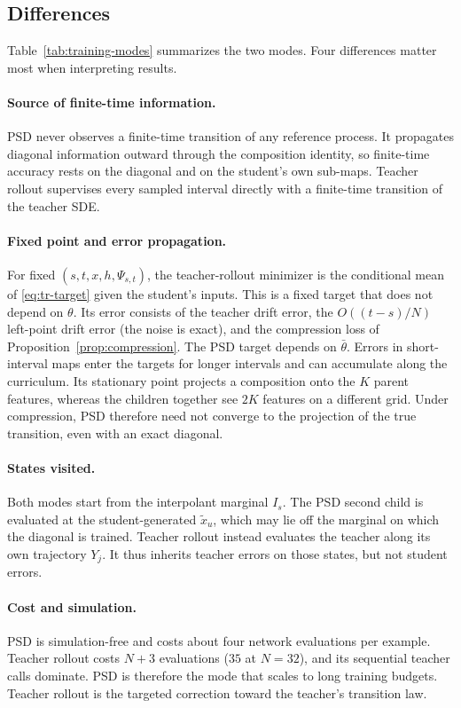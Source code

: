 \subsection{Differences}
Table~\ref{tab:training-modes} summarizes the two modes. Four differences matter most when interpreting results.

\paragraph{Source of finite-time information.} PSD never observes a finite-time transition of any reference process. It propagates diagonal information outward through the composition identity, so finite-time accuracy rests on the diagonal and on the student's own sub-maps. Teacher rollout supervises every sampled interval directly with a finite-time transition of the teacher SDE.

\paragraph{Fixed point and error propagation.} For fixed $(s,t,x,h,\Psi_{s,t})$, the teacher-rollout minimizer is the conditional mean of \eqref{eq:tr-target} given the student's inputs. This is a fixed target that does not depend on $\theta$. Its error consists of the teacher drift error, the $O((t-s)/N)$ left-point drift error (the noise is exact), and the compression loss of Proposition~\ref{prop:compression}. The PSD target depends on $\bar\theta$. Errors in short-interval maps enter the targets for longer intervals and can accumulate along the curriculum. Its stationary point projects a composition onto the $K$ parent features, whereas the children together see $2K$ features on a different grid. Under compression, PSD therefore need not converge to the projection of the true transition, even with an exact diagonal.

\paragraph{States visited.} Both modes start from the interpolant marginal $I_s$. The PSD second child is evaluated at the student-generated $\widetilde x_u$, which may lie off the marginal on which the diagonal is trained. Teacher rollout instead evaluates the teacher along its own trajectory $Y_j$. It thus inherits teacher errors on those states, but not student errors.

\paragraph{Cost and simulation.} PSD is simulation-free and costs about four network evaluations per example. Teacher rollout costs $N+3$ evaluations ($35$ at $N=32$), and its sequential teacher calls dominate. PSD is therefore the mode that scales to long training budgets. Teacher rollout is the targeted correction toward the teacher's transition law.

